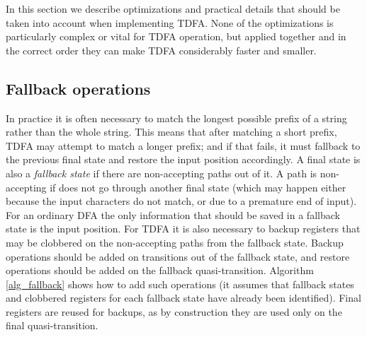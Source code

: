 \documentclass[]{article}
\begin{document}
In this section we describe optimizations and practical details that should be taken into account when implementing TDFA.
None of the optimizations is particularly complex or vital for TDFA operation,
but applied together and in the correct order they can make TDFA considerably faster and smaller.

\subsection{Fallback operations}

In practice it is often necessary to match the longest possible prefix of a string rather than the whole string.
This means that after matching a short prefix, TDFA may attempt to match a longer prefix;
and if that fails, it must fallback to the previous final state and restore the input position accordingly.
A final state is also a \emph{fallback state} if there are non-accepting paths out of it.
A path is non-accepting if does not go through another final state
(which may happen either because the input characters do not match, or due to a premature end of input).
%
For an ordinary DFA the only information that should be saved in a fallback state is the input position.
For TDFA it is also necessary to backup registers that may be clobbered on the non-accepting paths from the fallback state.
Backup operations should be added on transitions out of the fallback state,
and restore operations should be added on the fallback quasi-transition.
%
Algorithm \ref{alg_fallback} shows how to add such operations
(it assumes that fallback states and clobbered registers for each fallback state have already been identified).
Final registers are reused for backups, as by construction they are used only on the final quasi-transition.
\\
\end{document}
